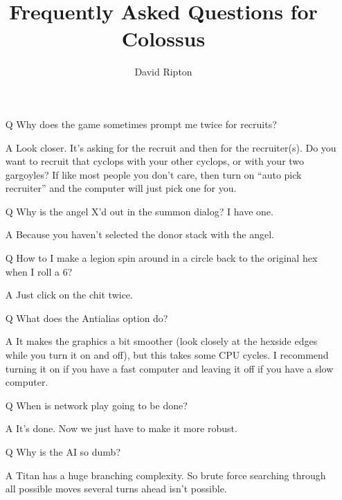 \documentclass{article}
\begin{document}

\title{Frequently Asked Questions for Colossus}

\author{David Ripton}

\maketitle

\begin{itemize}

\item[Q] Why does the game sometimes prompt me twice for recruits?

\item[A] Look closer. It's asking for the recruit and then for the recruiter(s).
 Do you want to recruit that cyclops with your other cyclops, or with
 your two gargoyles? If like most people you don't care, then turn on 
 ``auto pick recruiter'' and the computer will just pick one for you.

\item[Q] Why is the angel X'd out in the summon dialog?  I have one.

\item[A] Because you haven't selected the donor stack with the angel.

\item[Q] How to I make a legion spin around in a circle back to the original
 hex when I roll a 6? 

\item[A] Just click on the chit twice.

\item[Q] What does the Antialias option do?

\item[A] It makes the graphics a bit smoother (look closely at the hexside
 edges while you turn it on and off), but this takes some CPU cycles. I
 recommend turning it on if you have a fast computer and leaving it off
 if you have a slow computer. 

\item[Q] When is network play going to be done?

\item[A] It's done.  Now we just have to make it more robust.


\item[Q] Why is the AI so dumb?

\item[A] Titan has a huge branching complexity.  So brute force searching
through all possible moves several turns ahead isn't possible.



\end{itemize}
\end{document}

